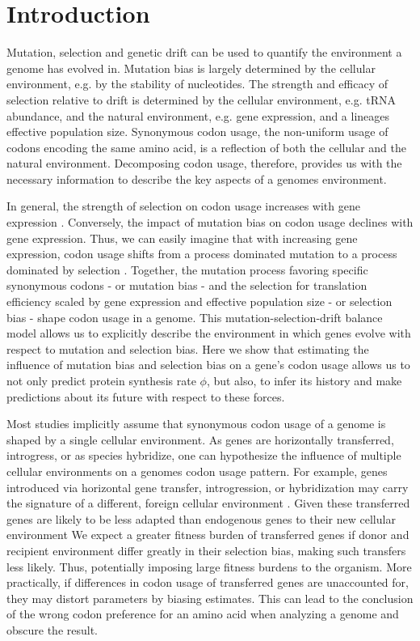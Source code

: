 \newpage


\section{Introduction}

Mutation, selection and genetic drift can be used to quantify the environment a genome has evolved in.
Mutation bias is largely determined by the cellular environment, e.g. by the stability of nucleotides.
The strength and efficacy of selection relative to drift is determined by the cellular environment, e.g. tRNA abundance, and the natural environment, e.g. gene expression, and a lineages effective population size.
Synonymous codon usage, the non-uniform usage of codons encoding the same amino acid, is a reflection of both the cellular and the natural environment.
Decomposing codon usage, therefore, provides us with the necessary information to describe the key aspects of a genomes environment. 

In general, the strength of selection on codon usage increases with gene expression \citep{ikemura1985, gouy1982, wallace2013, gilchrist2015}.
Conversely, the impact of mutation bias on codon usage declines with gene expression.
Thus, we can easily imagine that with increasing gene expression, codon usage shifts from a process dominated mutation to a process dominated by selection \citep{ShahAndGilchrist2011, gilchrist2015}.
Together, the mutation process favoring specific synonymous codons - or mutation bias -  and the selection for translation efficiency scaled by gene expression and effective population size - or selection bias -  shape codon usage in a genome.
This mutation-selection-drift balance model allows us to explicitly describe the environment in which genes evolve with respect to mutation and selection bias.
Here we show that estimating the influence of mutation bias and selection bias on a gene's codon usage allows us to not only predict protein synthesis rate $\phi$, but also, to infer its history and make predictions about its future with respect to these forces.

Most studies implicitly assume that synonymous codon usage of a genome is shaped by a single cellular environment. 
As genes are horizontally transferred, introgress, or as species hybridize, one can hypothesize the influence of multiple cellular environments on a genomes codon usage pattern.
For example, genes introduced via horizontal gene transfer, introgression, or hybridization may carry the signature of a different, foreign cellular environment \citep{medigue1991,lawrence1997}.
Given these transferred genes are likely to be less adapted than endogenous genes to their new cellular environment
We expect a greater fitness burden of transferred genes if donor and recipient environment differ greatly in their selection bias, making such transfers less likely.
Thus, potentially imposing large fitness burdens to the organism.
More practically, if differences in codon usage of transferred genes are unaccounted for, they may distort parameters by biasing estimates.
This can lead to the conclusion of the wrong codon preference for an amino acid when analyzing a genome and obscure the result.

